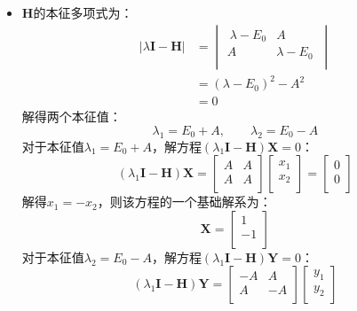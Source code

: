 \documentclass[a4paper,fontset=none]{ctexart}
\begin{document}
\begin{itemize}
        \item[2.1]
        $\bm{H}$的本征多项式为：
        \begin{align*}
        |\lambda\bm{I} - \bm{H}|
        &=
        \begin{vmatrix}
            \ \lambda-E_0 & A \\
            A & \lambda-E_0 \ \\
        \end{vmatrix} \\
        &= (\lambda - E_0)^2 - A^2 \\
        &= 0
        \end{align*}
        解得两个本征值：
        \[
        \lambda_1 = E_0 + A,\qquad \lambda_2 = E_0 - A
        \]
        对于本征值$\lambda_1 = E_0 + A$，解方程$(\lambda_1\bm{I} - \bm{H})\bm{X} = 0$：
        \[
        (\lambda_1\bm{I} - \bm{H})\bm{X}
        =
        \begin{bmatrix}
            A & A \\
            A & A \\
        \end{bmatrix}
        \begin{bmatrix}
            x_1 \\
            x_2 \\
        \end{bmatrix}
        =
        \begin{bmatrix}
            0 \\
            0 \\
        \end{bmatrix}
        \]
        解得$x_1 = -x_2$，则该方程的一个基础解系为：
        \[
        \bm{X}
        =
        \begin{bmatrix}
            1 \\
            -1 \\
        \end{bmatrix}
        \]
        对于本征值$\lambda_2 = E_0 - A$，解方程$(\lambda_1\bm{I} - \bm{H})\bm{Y} = 0$：
        \[
        (\lambda_1\bm{I} - \bm{H})\bm{Y}
        =
        \begin{bmatrix}
            -A & A \\
            A & -A \\
        \end{bmatrix}
        \begin{bmatrix}
            y_1 \\
            y_2 \\
        \end{bmatrix}
\]
\end{itemize}
\end{document}
